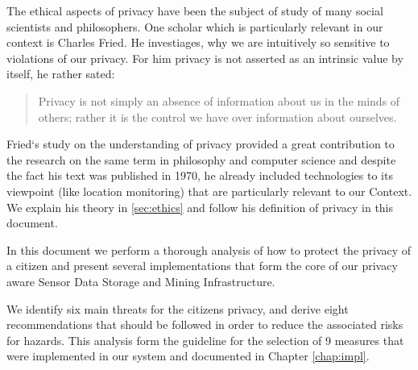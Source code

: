 \documentclass[external]{20120615_deliverable_template_ukob}
\theoremstyle{definition}
\begin{document}
The ethical aspects of privacy have been the subject of study of many
social scientists and philosophers. One scholar which is particularly
relevant in our context is Charles Fried. He investiages, why we are
intuitively so sensitive to violations of our privacy. For him privacy
is not asserted as an intrinsic value by itself, he rather sated:

\begin{quote}
Privacy is not simply an absence of information about us in the minds of others;
rather it is the control we have over information about ourselves.
\end{quote}

Fried`s study on the understanding of privacy provided a great
contribution to the research on the same term in philosophy and
computer science and despite the fact his text was published in 1970,
he already included technologies to its viewpoint (like location
monitoring) that are particularly relevant to our Context.  We explain
his theory in \ref{sec:ethics} and follow his definition of privacy in
this document.

In this document we perform a thorough analysis of how to protect the
privacy of a citizen and present several implementations that form the
core of our privacy aware Sensor Data Storage and Mining Infrastructure.

We identify six main threats for the citizens privacy, and derive
eight recommendations that should be followed in order to reduce the
associated risks for hazards.  This analysis form the guideline for
the selection of 9 measures that were implemented in our system and
documented in Chapter \ref{chap:impl}.



\clearpage




\end{document}
